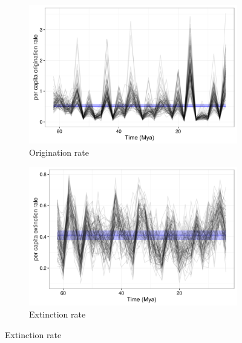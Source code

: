 \begin{figure}[p]
  \begin{subfigure}[b]{0.45\textwidth}
    \includegraphics[width=\textwidth,height=0.4\textheight,keepaspectratio=true]{chapter_coping/figure/orig_rate}
    \caption{Origination rate}
    \label{fig:origin_rate}
  \end{subfigure}
  \begin{subfigure}[b]{0.45\textwidth}
    \includegraphics[width=\textwidth,height=0.4\textheight,keepaspectratio=true]{chapter_coping/figure/death_rate}
    \caption{Extinction rate}
    \label{fig:extinct_rate}
  \end{subfigure}

\end{figure}
